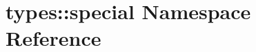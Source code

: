 \hypertarget{namespacetypes_1_1special}{}\section{types\+::special Namespace Reference}
\label{namespacetypes_1_1special}
